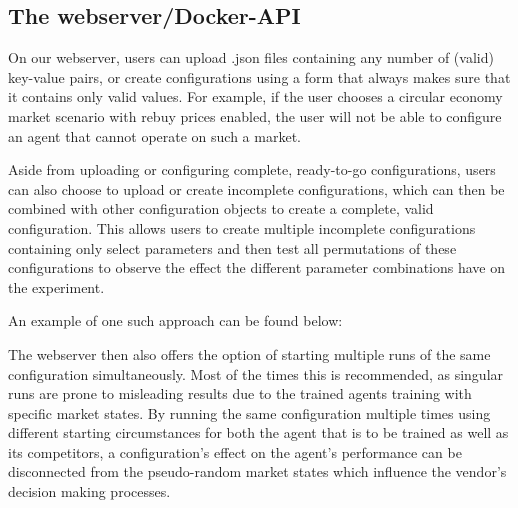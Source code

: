 \subsection{The webserver/Docker-API}

On our webserver, users can upload .json files containing any number of (valid) key-value pairs, or create configurations using a form that always makes sure that it contains only valid values. For example, if the user chooses a circular economy market scenario with rebuy prices enabled, the user will not be able to configure an agent that cannot operate on such a market.

Aside from uploading or configuring complete, ready-to-go configurations, users can also choose to upload or create incomplete configurations, which can then be combined with other configuration objects to create a complete, valid configuration. This allows users to create multiple incomplete configurations containing only select parameters and then test all permutations of these configurations to observe the effect the different parameter combinations have on the experiment. 

An example of one such approach can be found below:

The webserver then also offers the option of starting multiple runs of the same configuration simultaneously. Most of the times this is recommended, as singular runs are prone to misleading results due to the trained agents training with specific market states. By running the same configuration multiple times using different starting circumstances for both the agent that is to be trained as well as its competitors, a configuration's effect on the agent's performance can be disconnected from the pseudo-random market states which influence the vendor's decision making processes.

